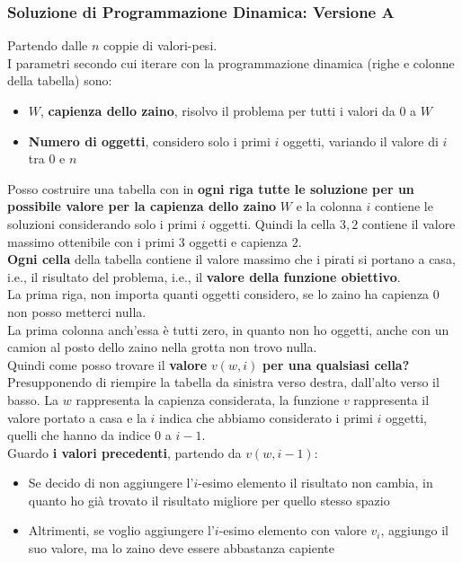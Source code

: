 \newpage

\subsubsection{Soluzione di Programmazione Dinamica: Versione A}

Partendo dalle $n$ coppie di valori-pesi.\\

I parametri secondo cui iterare con la programmazione dinamica (righe e colonne della tabella) sono: 
\begin{itemize}
	\item $W$, \textbf{capienza dello zaino}, risolvo il problema per tutti i valori da 0 a $W$
	\item \textbf{Numero di oggetti}, considero solo i primi $i$ oggetti, variando il valore di $i$ tra 0 e $n$
\end{itemize}

Posso costruire una tabella con in \textbf{ogni riga tutte le soluzione per un possibile valore per la capienza dello zaino} $W$ e la colonna $i$ contiene le soluzioni considerando solo i primi $i$ oggetti. Quindi la cella $3,2$ contiene il valore massimo ottenibile con i primi $3$ oggetti e capienza $2$.\\

\textbf{Ogni cella} della tabella contiene il valore massimo che i pirati si portano a casa, i.e., il risultato del problema, i.e., il \textbf{valore della funzione obiettivo}.\\

La prima riga, non importa  quanti oggetti considero, se lo zaino ha capienza 0 non posso metterci nulla.\\
La prima colonna anch'essa è tutti zero, in quanto non ho oggetti, anche con un camion al posto dello zaino nella grotta non trovo nulla.\\

Quindi come posso trovare il \textbf{valore} $v(w,i)$ \textbf{per una qualsiasi cella?} Presupponendo di riempire la tabella da sinistra verso destra, dall'alto verso il basso. La $w$ rappresenta la capienza considerata, la funzione $v$ rappresenta il valore portato a casa e la $i$ indica che abbiamo considerato i primi $i$ oggetti, quelli che hanno da indice 0 a $i-1$.\\

Guardo \textbf{i valori precedenti}, partendo da $v(w,i-1)$:
\begin{itemize}
	\item Se decido di non aggiungere l'$i$-esimo elemento il risultato non cambia, in quanto ho già trovato il risultato migliore per quello stesso spazio
	\item Altrimenti, se voglio aggiungere l'$i$-esimo elemento con valore $v_i$, aggiungo il suo valore, ma lo zaino deve essere abbastanza capiente
\end{itemize}

